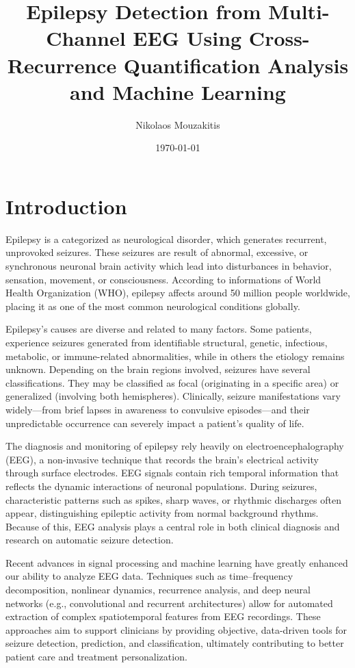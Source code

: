 \documentclass{article}
\title{Epilepsy Detection from Multi-Channel EEG Using Cross-Recurrence Quantification Analysis and Machine Learning}
\author{Nikolaos Mouzakitis} %
\date{\today} %
\begin{document}
	\maketitle

	\section*{Introduction}

	Epilepsy is a categorized as neurological disorder, which generates recurrent, unprovoked seizures. 
	These seizures are result of abnormal, excessive, or synchronous neuronal brain activity which lead into 
	disturbances in behavior, sensation, movement, or consciousness. 
	According to informations of World Health Organization (WHO), epilepsy affects 
	around 50 million people worldwide, placing it as one of the most common neurological conditions globally.

	Epilepsy's causes are diverse and related to many factors. Some patients, experience seizures generated from identifiable structural, 
	genetic, infectious, metabolic, or immune-related abnormalities, while in others the etiology remains unknown. 
	Depending on the brain regions involved, seizures have several classifications. They may be classified as focal 
	(originating in a specific area) or generalized (involving both hemispheres). 
	Clinically, seizure manifestations vary widely—from brief lapses in awareness to 
	convulsive episodes—and their unpredictable occurrence can severely impact a patient’s quality of life.

	The diagnosis and monitoring of epilepsy rely heavily on electroencephalography (EEG), a non-invasive technique that records the brain’s electrical activity through surface electrodes. EEG signals contain rich temporal information that reflects the dynamic interactions of neuronal populations. During seizures, characteristic patterns such as spikes, sharp waves, or rhythmic discharges often appear, distinguishing epileptic activity from normal background rhythms. Because of this, EEG analysis plays a central role in both clinical diagnosis and research on automatic seizure detection.

	Recent advances in signal processing and machine learning have greatly enhanced our ability to analyze EEG data. Techniques such as time–frequency decomposition, nonlinear dynamics, recurrence analysis, and deep neural networks (e.g., convolutional and recurrent architectures) allow for automated extraction of complex spatiotemporal features from EEG recordings. These approaches aim to support clinicians by providing objective, data-driven tools for seizure detection, prediction, and classification, ultimately contributing to better patient care and treatment personalization.
\end{document}
